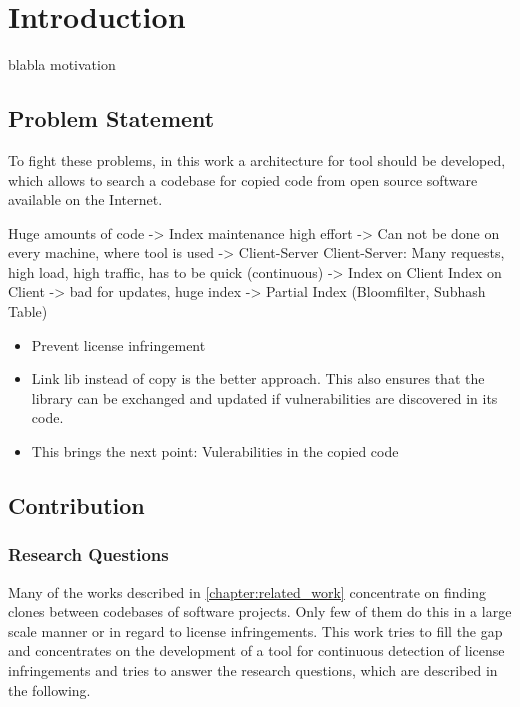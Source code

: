 
\chapter{Introduction}\label{chapter:introduction}
blabla motivation

\section{Problem Statement}\label{section:introduction/problem}

To fight these problems, in this work a architecture for tool should be developed, which allows to search a codebase for copied code from open source software available on the Internet.

Huge amounts of code -> Index maintenance high effort -> Can not be done on every machine, where tool is used -> Client-Server
Client-Server: Many requests, high load, high traffic, has to be quick (continuous) -> Index on Client
Index on Client -> bad for updates, huge index -> Partial Index (Bloomfilter, Subhash Table)

\begin{itemize}
	\item Prevent license infringement
	\item Link lib instead of copy is the better approach. This also ensures that the library can be exchanged and updated if vulnerabilities are discovered in its code.
	\item This brings the next point: Vulerabilities in the copied code
\end{itemize}

\section{Contribution}
\subsection*{Research Questions}\label{section:introduction/research_questions}
Many of the works described in \autoref{chapter:related_work} concentrate on finding clones between codebases of software projects.
Only few of them do this in a large scale manner or in regard to license infringements.
This work tries to fill the gap and concentrates on the development of a tool for continuous detection of license infringements and tries to answer the research questions, which are described in the following.

